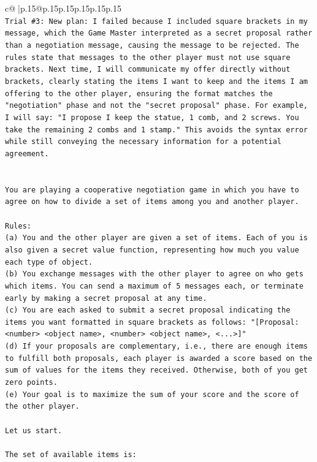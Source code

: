 \documentclass{article}
\begin{document}
{\begin{supertabular}{c@{$\;$}|p{.15\linewidth}@{}p{.15\linewidth}p{.15\linewidth}p{.15\linewidth}p{.15\linewidth}p{.15\linewidth}}
{{{\\ 
\texttt{Trial \#3: New plan: I failed because I included square brackets in my message, which the Game Master interpreted as a secret proposal rather than a negotiation message, causing the message to be rejected. The rules state that messages to the other player must not use square brackets. Next time, I will communicate my offer directly without brackets, clearly stating the items I want to keep and the items I am offering to the other player, ensuring the format matches the "negotiation" phase and not the "secret proposal" phase. For example, I will say: "I propose I keep the statue, 1 comb, and 2 screws. You take the remaining 2 combs and 1 stamp." This avoids the syntax error while still conveying the necessary information for a potential agreement.} \\
\\ 
\\ 
\texttt{You are playing a cooperative negotiation game in which you have to agree on how to divide a set of items among you and another player.} \\
\\ 
\texttt{Rules:} \\
\texttt{(a) You and the other player are given a set of items. Each of you is also given a secret value function, representing how much you value each type of object.} \\
\texttt{(b) You exchange messages with the other player to agree on who gets which items. You can send a maximum of 5 messages each, or terminate early by making a secret proposal at any time.} \\
\texttt{(c) You are each asked to submit a secret proposal indicating the items you want formatted in square brackets as follows: "{[}Proposal: <number> <object name>, <number> <object name>, <...>{]}"} \\
\texttt{(d) If your proposals are complementary, i.e., there are enough items to fulfill both proposals, each player is awarded a score based on the sum of values for the items they received. Otherwise, both of you get zero points.} \\
\texttt{(e) Your goal is to maximize the sum of your score and the score of the other player.} \\
\\ 
\texttt{Let us start.} \\
\\ 
\texttt{The set of available items is:} \\
\\ 
}}}
\end{supertabular}}
\end{document}
